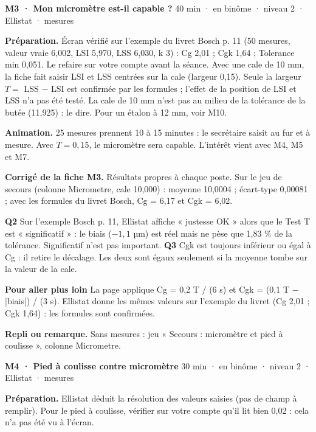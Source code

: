 \vspace{3pt}
\begin{tcolorbox}[act]\textbf{M3 · Mon micromètre est-il capable ?} \hfill {\small 40 min · en binôme · niveau 2 · Ellistat · mesures}\end{tcolorbox}
\textbf{Préparation.} Écran vérifié sur l'exemple du livret Bosch p. 11 (50 mesures, valeur vraie 6,002, LSI 5,970, LSS 6,030, k 3) : Cg 2,01 ; Cgk 1,64 ; Tolerance min 0,051. Le refaire sur votre compte avant la séance. Avec une cale de 10 mm, la fiche fait saisir LSI et LSS centrées sur la cale (largeur 0,15). Seule la largeur $T = $ LSS $-$ LSI est confirmée par les formules ; l'effet de la position de LSI et LSS n'a pas été testé. La cale de 10 mm n'est pas au milieu de la tolérance de la butée (11,925) : le dire. Pour un étalon à 12 mm, voir M10.\par
\textbf{Animation.} 25 mesures prennent 10 à 15 minutes : le secrétaire saisit au fur et à mesure. Avec $T = 0{,}15$, le micromètre sera capable. L'intérêt vient avec M4, M5 et M7.\par
\textbf{\color{ok}Corrigé de la fiche M3.} Résultats propres à chaque poste. Sur le jeu de secours (colonne Micrometre, cale 10,000) : moyenne 10,0004 ; écart-type 0,00081 ; avec les formules du livret Bosch, Cg = 6,17 et Cgk = 6,02.\par \textbf{Q2} Sur l'exemple Bosch p. 11, Ellistat affiche « justesse OK » alors que le Test T est « significatif » : le biais ($-1{,}1$ µm) est réel mais ne pèse que 1,83 \% de la tolérance. Significatif n'est pas important. \textbf{Q3} Cgk est toujours inférieur ou égal à Cg : il retire le décalage. Les deux sont égaux seulement si la moyenne tombe sur la valeur de la cale.\par \textbf{Pour aller plus loin} La page applique Cg = 0,2 T / (6 s) et Cgk = (0,1 T $-$ |biais|) / (3 s). Ellistat donne les mêmes valeurs sur l'exemple du livret (Cg 2,01 ; Cgk 1,64) : les formules sont confirmées.\par
{\small\textbf{Repli ou remarque.} Sans mesures : jeu « Secours : micromètre et pied à coulisse », colonne Micrometre.}\par
\vspace{3pt}
\begin{tcolorbox}[act]\textbf{M4 · Pied à coulisse contre micromètre} \hfill {\small 30 min · en binôme · niveau 2 · Ellistat · mesures}\end{tcolorbox}
\textbf{Préparation.} Ellistat déduit la résolution des valeurs saisies (pas de champ à remplir). Pour le pied à coulisse, vérifier sur votre compte qu'il lit bien 0,02 : cela n'a pas été vu à l'écran.\par
